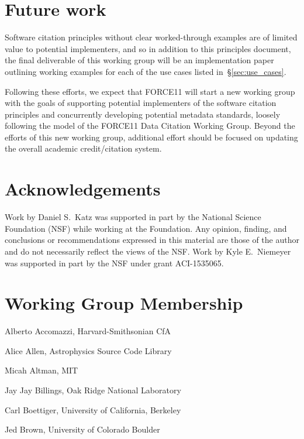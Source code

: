 \documentclass[12pt, oneside]{amsart}
\begin{document}
\section{Future work}
\label{sec:futurework}

Software citation principles without clear worked-through examples are of
limited value to potential implementers, and so in addition to this principles
document, the final deliverable of this working group will be an implementation
paper outlining working examples for each of the use cases listed in~\S\ref{sec:use_cases}.

Following these efforts, we expect that FORCE11 will start a new working group
with the goals of supporting potential implementers of the software citation
principles and concurrently developing potential metadata standards, loosely following the model
of the FORCE11 Data Citation Working Group.
Beyond the efforts of this new working group, additional effort should be focused on updating the overall academic credit\slash citation system.


\section*{Acknowledgements}

Work by Daniel S.~Katz was supported in part by the National Science Foundation (NSF) while working at the Foundation.
Any opinion, finding, and conclusions or recommendations expressed in this material are those of the author and do not necessarily reflect the views of the NSF.
Work by Kyle E.~Niemeyer was supported in part by the NSF under grant ACI-1535065.

\appendix

\section{Working Group Membership}
\label{app:wg_members}

Alberto Accomazzi, Harvard-Smithsonian CfA

Alice Allen, Astrophysics Source Code Library

Micah Altman, MIT

Jay Jay Billings, Oak Ridge National Laboratory

Carl Boettiger, University of California,  Berkeley

Jed Brown, University of Colorado Boulder
\end{document}
